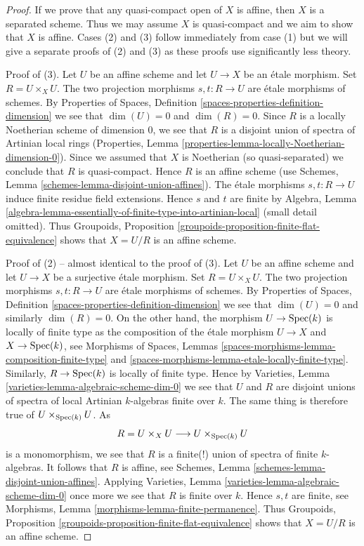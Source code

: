 \begin{proof}
If we prove that any quasi-compact open of $X$ is affine, then
$X$ is a separated scheme. Thus we may assume $X$ is quasi-compact
and we aim to show that $X$ is affine.
Cases (2) and (3) follow immediately from case (1) but we will give a separate
proofs of (2) and (3) as these proofs use significantly less theory.

\medskip\noindent
Proof of (3). Let $U$ be an affine scheme and let $U \to X$ be an
\'etale morphism. Set $R = U \times_X U$. The two projection
morphisms $s, t : R \to U$ are \'etale morphisms of schemes. By
Properties of Spaces, Definition \ref{spaces-properties-definition-dimension}
we see that $\dim(U) = 0$ and $\dim(R) = 0$.
Since $R$ is a locally Noetherian scheme of dimension $0$,
we see that $R$ is a disjoint union of spectra of
Artinian local rings
(Properties, Lemma \ref{properties-lemma-locally-Noetherian-dimension-0}).
Since we assumed that $X$ is Noetherian (so quasi-separated) we
conclude that $R$ is quasi-compact. Hence $R$ is an affine scheme
(use Schemes, Lemma \ref{schemes-lemma-disjoint-union-affines}).
The \'etale morphisms $s, t : R \to U$ induce finite residue field
extensions. Hence $s$ and $t$ are finite by
Algebra, Lemma
\ref{algebra-lemma-essentially-of-finite-type-into-artinian-local}
(small detail omitted).
Thus
Groupoids, Proposition \ref{groupoids-proposition-finite-flat-equivalence}
shows that $X = U/R$ is an affine scheme.

\medskip\noindent
Proof of (2) -- almost identical to the proof of (3).
Let $U$ be an affine scheme and let $U \to X$ be a surjective \'etale morphism.
Set $R = U \times_X U$. The two projection morphisms
$s, t : R \to U$ are \'etale morphisms of schemes. By
Properties of Spaces, Definition \ref{spaces-properties-definition-dimension}
we see that $\dim(U) = 0$ and similarly $\dim(R) = 0$.
On the other hand, the morphism $U \to \operatorname{Spec}(k)$ is locally of finite
type as the composition of the \'etale morphism $U \to X$ and
$X \to \operatorname{Spec}(k)$, see
Morphisms of Spaces,
Lemmas \ref{spaces-morphisms-lemma-composition-finite-type} and
\ref{spaces-morphisms-lemma-etale-locally-finite-type}.
Similarly, $R \to \operatorname{Spec}(k)$ is locally of finite type.
Hence by
Varieties, Lemma \ref{varieties-lemma-algebraic-scheme-dim-0}
we see that $U$ and $R$ are disjoint unions of spectra of
local Artinian $k$-algebras finite over $k$. The same thing
is therefore true of $U \times_{\operatorname{Spec}(k)} U$. As
$$
R = U \times_X U \longrightarrow U \times_{\operatorname{Spec}(k)} U
$$
is a monomorphism, we see that $R$ is a finite(!) union of spectra of
finite $k$-algebras. It follows that $R$ is affine, see
Schemes, Lemma \ref{schemes-lemma-disjoint-union-affines}.
Applying
Varieties, Lemma \ref{varieties-lemma-algebraic-scheme-dim-0}
once more we see that $R$ is finite over $k$. Hence $s, t$
are finite, see
Morphisms, Lemma \ref{morphisms-lemma-finite-permanence}.
Thus
Groupoids, Proposition \ref{groupoids-proposition-finite-flat-equivalence}
shows that $X = U/R$ is an affine scheme.


\end{proof}
